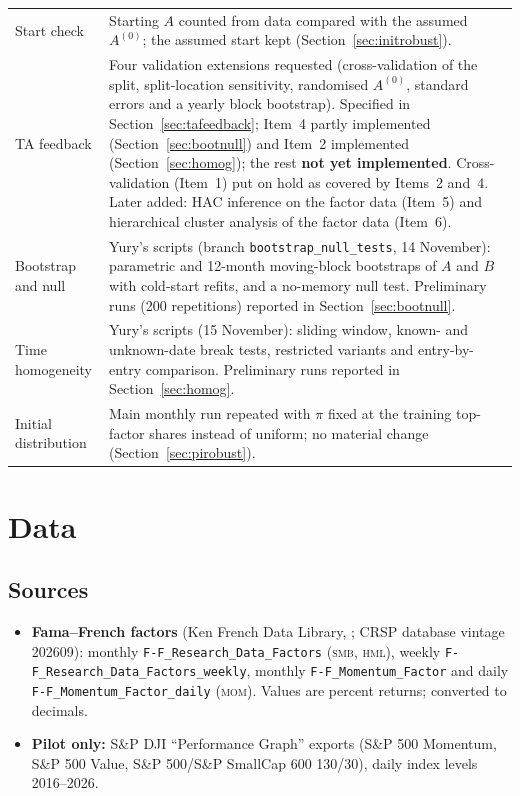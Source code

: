 \documentclass[11pt]{article}
\newcommand{\SMB}{\textsc{smb}}
\newcommand{\HML}{\textsc{hml}}
\newcommand{\MOM}{\textsc{mom}}
\begin{document}
\begin{longtable}{@{}p{2.2cm}p{12.8cm}@{}}
Start check & Starting $A$ counted from data compared with the assumed $A^{(0)}$; the assumed start kept (Section~\ref{sec:initrobust}). \\
TA feedback & Four validation extensions requested (cross-validation of the split, split-location sensitivity, randomised $A^{(0)}$, standard errors and a yearly block bootstrap). Specified in Section~\ref{sec:tafeedback}; Item~4 partly implemented (Section~\ref{sec:bootnull}) and Item~2 implemented (Section~\ref{sec:homog}); the rest \textbf{not yet implemented}. Cross-validation (Item~1) put on hold as covered by Items~2 and~4. Later added: HAC inference on the factor data (Item~5) and hierarchical cluster analysis of the factor data (Item~6). \\
Bootstrap and null & Yury's scripts (branch \texttt{bootstrap\_null\_tests}, 14 November): parametric and 12-month moving-block bootstraps of $A$ and $B$ with cold-start refits, and a no-memory null test. Preliminary runs (200 repetitions) reported in Section~\ref{sec:bootnull}. \\
Time homogeneity & Yury's scripts (15 November): sliding window, known- and unknown-date break tests, restricted variants and entry-by-entry comparison. Preliminary runs reported in Section~\ref{sec:homog}. \\
Initial distribution & Main monthly run repeated with $\pi$ fixed at the training top-factor shares instead of uniform; no material change (Section~\ref{sec:pirobust}). \\
\bottomrule
\end{longtable}

\section{Data}

\subsection{Sources}
\begin{itemize}
\item \sloppy\textbf{Fama--French factors} (Ken French Data Library, \citealp{french_library}; CRSP database vintage 202609): monthly \texttt{F-F\_Research\_Data\_Factors} (\SMB, \HML), weekly \texttt{F-F\_Research\_Data\_Factors\_weekly}, monthly \texttt{F-F\_Momentum\_Factor} and daily \texttt{F-F\_Momentum\_Factor\_daily} (\MOM). Values are percent returns; converted to decimals.
\item \textbf{Pilot only:} S\&P DJI ``Performance Graph'' exports (S\&P 500 Momentum, S\&P 500 Value, S\&P 500/S\&P SmallCap 600 130/30), daily index levels 2016--2026.
\end{itemize}
\end{document}
